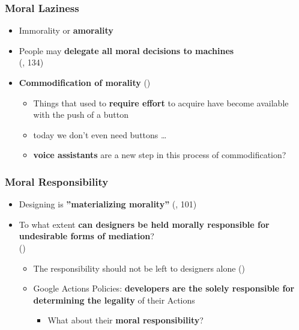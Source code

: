 \documentclass{beamer}
\begin{document}
\begin{frame}
\frametitle{Moral Laziness}
\begin{itemize}
	\item Immorality or \textbf{amorality}
	\medskip
	\item People may \textbf{delegate all moral decisions to machines} \\(\cite{verbeek2011moralizing}, 134)
	\medskip
	\item \textbf{Commodification of morality} (\cite{borgmann1984technology})
		 \begin{itemize}
		 	\item Things that used to \textbf{require effort} to acquire have become
		 	available with the push of a button
		 	\smallskip
		 	\item today we don't even need buttons \dots
		 	\smallskip
		 	\item \textbf{voice assistants} are a new step in this process of commodification?
		 \end{itemize}
\end{itemize}
\end{frame}

\begin{frame}
	\frametitle{Moral Responsibility}
	\begin{itemize}
		\item Designing is \textbf{''materializing morality''} (\cite{verbeek2011moralizing}, 101)
		\bigskip
		\item To what extent \textbf{can designers be held morally responsible for undesirable forms of mediation}?\\(\cite{verbeek2011moralizing})
		\smallskip
		\begin{itemize}
			\item The responsibility should not be left to designers alone (\cite{verbeek2011moralizing})
			\medskip
			\item Google Actions Policies: \textbf{developers are the solely responsible for determining the legality} of their Actions
			\smallskip
			\begin{itemize}
				\item What about their \textbf{moral responsibility}?
			\end{itemize}
		\end{itemize}
	\end{itemize}
\end{frame}
\end{document}
